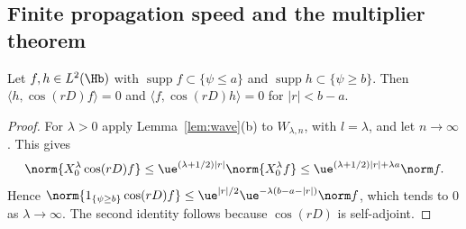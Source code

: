 \subsection{Finite propagation speed and the multiplier theorem}

\begin{lemma}\label{os:speed}
Let $f,h\in L^2(\Hb)$ with $\operatorname{supp}f\subset\{\psi\le a\}$ and $\operatorname{supp}h\subset\{\psi\ge b\}$. Then
$\langle h,\cos(rD)f\rangle=0$ and $\langle f,\cos(rD)h\rangle=0$ for $|r|<b-a$.
\end{lemma}
\begin{proof}
For $\lambda>0$ apply Lemma~\ref{lem:wave}(b) to $W_{\lambda,n}$, with $l=\lambda$, and let $n\to\infty$. This gives
\[
\norm{\osX^\lambda\cos(rD)f}\le\ue^{(\lambda+1/2)|r|}\norm{\osX^\lambda f}\le\ue^{(\lambda+1/2)|r|+\lambda a}\norm f.
\]
Hence
$\norm{1_{\{\psi\ge b\}}\cos(rD)f}\le\ue^{|r|/2}\ue^{-\lambda(b-a-|r|)}\norm f$, which tends to $0$ as $\lambda\to\infty$. The second identity follows
because $\cos(rD)$ is self-adjoint.
\end{proof}

